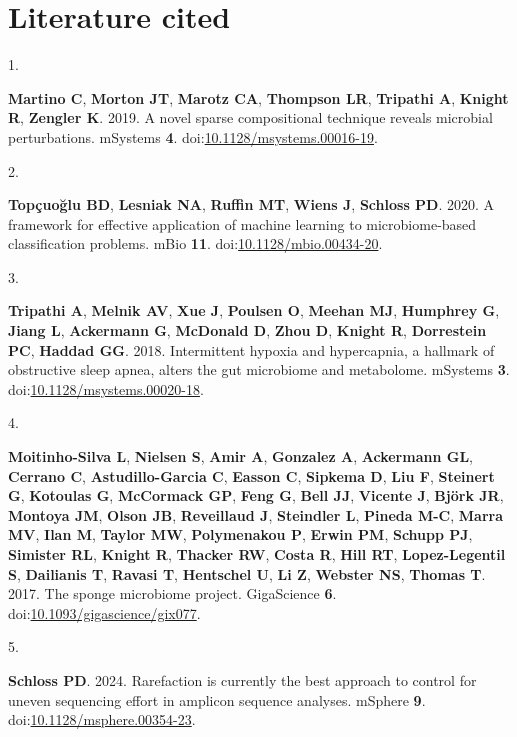 \documentclass[
]{article}
\newlength{\cslhangindent}
\newlength{\csllabelwidth}
\newenvironment{CSLReferences}[2] %
 {\begin{list}{}{%
  \setlength{\itemindent}{0pt}
  \setlength{\leftmargin}{0pt}
  \setlength{\parsep}{0pt}
  \ifodd #1
   \setlength{\leftmargin}{\cslhangindent}
   \setlength{\itemindent}{-1\cslhangindent}
  \fi
  \setlength{\itemsep}{#2\baselineskip}}}
 {\end{list}}
\newcommand{\CSLLeftMargin}[1]{\parbox[t]{\csllabelwidth}{\strut#1\strut}}
\newcommand{\CSLRightInline}[1]{\parbox[t]{\linewidth - \csllabelwidth}{\strut#1\strut}}
\begin{document}
\section*{Literature cited}\label{literature-cited}

\label{refs}
\begin{CSLReferences}{0}{1}
\CSLLeftMargin{1. }%
\CSLRightInline{\textbf{Martino C}, \textbf{Morton JT}, \textbf{Marotz
CA}, \textbf{Thompson LR}, \textbf{Tripathi A}, \textbf{Knight R},
\textbf{Zengler K}. 2019. A novel sparse compositional technique reveals
microbial perturbations. mSystems \textbf{4}.
doi:\href{https://doi.org/10.1128/msystems.00016-19}{10.1128/msystems.00016-19}.}

\CSLLeftMargin{2. }%
\CSLRightInline{\textbf{Topçuoğlu BD}, \textbf{Lesniak NA},
\textbf{Ruffin MT}, \textbf{Wiens J}, \textbf{Schloss PD}. 2020. A
framework for effective application of machine learning to
microbiome-based classification problems. mBio \textbf{11}.
doi:\href{https://doi.org/10.1128/mbio.00434-20}{10.1128/mbio.00434-20}.}

\CSLLeftMargin{3. }%
\CSLRightInline{\textbf{Tripathi A}, \textbf{Melnik AV}, \textbf{Xue J},
\textbf{Poulsen O}, \textbf{Meehan MJ}, \textbf{Humphrey G},
\textbf{Jiang L}, \textbf{Ackermann G}, \textbf{McDonald D},
\textbf{Zhou D}, \textbf{Knight R}, \textbf{Dorrestein PC},
\textbf{Haddad GG}. 2018. Intermittent hypoxia and hypercapnia, a
hallmark of obstructive sleep apnea, alters the gut microbiome and
metabolome. mSystems \textbf{3}.
doi:\href{https://doi.org/10.1128/msystems.00020-18}{10.1128/msystems.00020-18}.}

\CSLLeftMargin{4. }%
\CSLRightInline{\textbf{Moitinho-Silva L}, \textbf{Nielsen S},
\textbf{Amir A}, \textbf{Gonzalez A}, \textbf{Ackermann GL},
\textbf{Cerrano C}, \textbf{Astudillo-Garcia C}, \textbf{Easson C},
\textbf{Sipkema D}, \textbf{Liu F}, \textbf{Steinert G},
\textbf{Kotoulas G}, \textbf{McCormack GP}, \textbf{Feng G},
\textbf{Bell JJ}, \textbf{Vicente J}, \textbf{Björk JR}, \textbf{Montoya
JM}, \textbf{Olson JB}, \textbf{Reveillaud J}, \textbf{Steindler L},
\textbf{Pineda M-C}, \textbf{Marra MV}, \textbf{Ilan M}, \textbf{Taylor
MW}, \textbf{Polymenakou P}, \textbf{Erwin PM}, \textbf{Schupp PJ},
\textbf{Simister RL}, \textbf{Knight R}, \textbf{Thacker RW},
\textbf{Costa R}, \textbf{Hill RT}, \textbf{Lopez-Legentil S},
\textbf{Dailianis T}, \textbf{Ravasi T}, \textbf{Hentschel U},
\textbf{Li Z}, \textbf{Webster NS}, \textbf{Thomas T}. 2017. The sponge
microbiome project. GigaScience \textbf{6}.
doi:\href{https://doi.org/10.1093/gigascience/gix077}{10.1093/gigascience/gix077}.}

\CSLLeftMargin{5. }%
\CSLRightInline{\textbf{Schloss PD}. 2024. Rarefaction is currently the
best approach to control for uneven sequencing effort in amplicon
sequence analyses. mSphere \textbf{9}.
doi:\href{https://doi.org/10.1128/msphere.00354-23}{10.1128/msphere.00354-23}.}

\end{CSLReferences}
\end{document}
